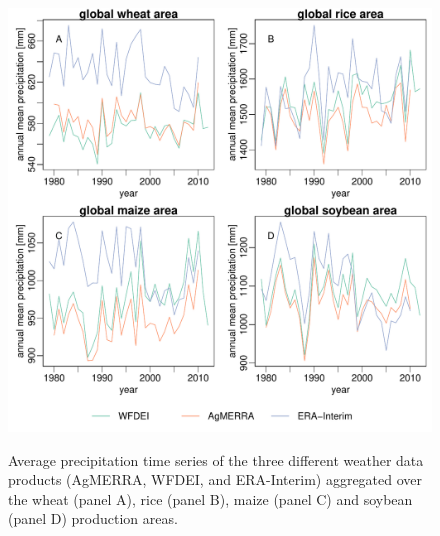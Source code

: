 \documentclass[10pt]{article}
\begin{document}
\begin{figure}[h!]
\includegraphics[width=\textwidth]{precip_4crops_totalarea.pdf}\\
\caption{Average precipitation time series of the three different weather data products (AgMERRA, WFDEI, and ERA-Interim) aggregated over the wheat (panel A), rice (panel B), maize (panel C) and soybean (panel D) production areas.}
\label{fig:precipitation}
\end{figure}
\end{document}
